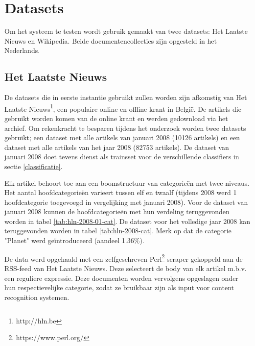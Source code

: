 \chapter{Datasets}\label{hs:datasets}
Om het systeem te testen wordt gebruik gemaakt van twee datasets: Het Laatste Nieuws en Wikipedia. Beide documentencollecties zijn opgesteld in het Nederlands. 

\section{Het Laatste Nieuws}
De datasets die in eerste instantie gebruikt zullen worden zijn afkomstig van Het Laatste Nieuws\footnote{http://hln.be}, een populaire online en offline krant in Belgi\"e. De artikels die gebruikt worden komen van de online krant en werden gedownload via het archief. Om rekenkracht te besparen tijdens het onderzoek worden twee datasets gebruikt; een dataset met alle artikels van januari 2008 (10126 artikels) en een dataset met alle artikels van het jaar 2008 (82753 artikels). De dataset van januari 2008 doet tevens dienst als trainsset voor de verschillende classifiers in sectie \ref{classificatie}.

Elk artikel behoort toe aan een boomstructuur van categorie\"en met twee niveaus. Het aantal hoofdcategorie\"en varieert tussen elf en twaalf (tijdens 2008 werd 1 hoofdcategorie toegevoegd in vergelijking met januari 2008). Voor de dataset van januari 2008 kunnen de hoofdcategorie\"en met hun verdeling teruggevonden worden in tabel \ref{tab:hln-2008-01-cat}. De dataset voor het volledige jaar 2008 kan teruggevonden worden in tabel \ref{tab:hln-2008-cat}. Merk op dat de categorie "Planet" werd ge\"introduceerd (aandeel 1.36\%).

De data werd opgehaald met een zelfgeschreven Perl\footnote{https://www.perl.org/} scraper gekoppeld aan de RSS-feed van Het Laatste Nieuws. Deze selecteert de body van elk artikel m.b.v. een reguliere expressie. Deze documenten worden vervolgens opgeslagen onder hun respectievelijke categorie, zodat ze bruikbaar zijn als input voor content recognition systemen. 

